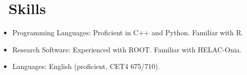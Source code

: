 \documentclass{resume}
\begin{document}

\section{\faCogs\ Skills}
\begin{itemize}[parsep=0.5ex]
  \item Programming Languages: Proficient in C++ and Python. Familiar with R.
  \item Research Software: Experienced with ROOT. Familiar with HELAC-Onia.
  \item Languages: English (proficient, CET4 675/710).
\end{itemize}


%
%
\end{document}
